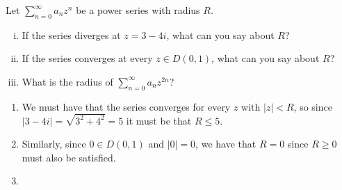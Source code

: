 \documentclass{article}
\newcounter{Problem}
\newenvironment{Problem}{\begin{Exercise}[name={Problem},
                                          counter={Problem}]}
                        {\end{Exercise}}
\begin{document}
\begin{Problem}
  Let $\sum_{n=0}^\infty a_n z^n$ be a power series with radius $R$.
  \begin{enumerate}[(i)]
    \item{
      If the series diverges at $z = 3 - 4i$, what can you say about $R$?
    }
    \item{
      If the series converges at every $z \in D(0, 1)$, what can you say about
      $R$?
    }
    \item{
      What is the radius of $\sum_{n=0}^\infty a_n z^{2n}$?
    }
  \end{enumerate}
\end{Problem}

\begin{Answer}
  \begin{enumerate}
    \item{
      We must have that the series converges for every $z$ with $|z| <
      R$, so since $|3 - 4i| = \sqrt{3^2 + 4^2} = 5$ it must be that
      $R \leq 5$.
    }
    \item{
      Similarly, since $0 \in D(0,1)$ and $|0| = 0$, we have that
      $R = 0$ since $R \geq 0$ must also be satisfied.
    }
    \item{
    }
  \end{enumerate}
\end{Answer}
\end{document}
